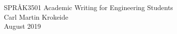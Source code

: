 \documentclass[a4paper]{article}
\begin{document}
\begin{titlepage}
\begin{center}
\Large SPRÅK3501 Academic Writing for Engineering Students \\
\vspace{10pt}
\large Carl Martin Krokeide \\
\vspace{10pt}
\large August 2019 
\end{center}
\end{titlepage}




\newpage


 
\newpage



\end{document}
